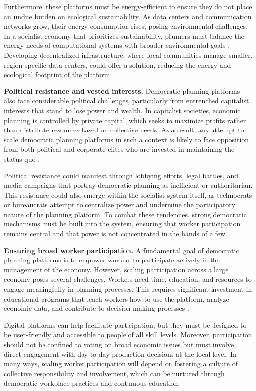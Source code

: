 \begin{refsection}
Furthermore, these platforms must be energy-efficient to ensure they do not place an undue burden on ecological sustainability. As data centers and communication networks grow, their energy consumption rises, posing environmental challenges. In a socialist economy that prioritizes sustainability, planners must balance the energy needs of computational systems with broader environmental goals \cite[pp.~76]{smil2018energy}. Developing decentralized infrastructure, where local communities manage smaller, region-specific data centers, could offer a solution, reducing the energy and ecological footprint of the platform.

\textbf{Political resistance and vested interests.} Democratic planning platforms also face considerable political challenges, particularly from entrenched capitalist interests that stand to lose power and wealth. In capitalist societies, economic planning is controlled by private capital, which seeks to maximize profits rather than distribute resources based on collective needs. As a result, any attempt to scale democratic planning platforms in such a context is likely to face opposition from both political and corporate elites who are invested in maintaining the status quo \cite[pp.~22]{wright2010envisioning}. 

Political resistance could manifest through lobbying efforts, legal battles, and media campaigns that portray democratic planning as inefficient or authoritarian. This resistance could also emerge within the socialist system itself, as technocrats or bureaucrats attempt to centralize power and undermine the participatory nature of the planning platform. To combat these tendencies, strong democratic mechanisms must be built into the system, ensuring that worker participation remains central and that power is not concentrated in the hands of a few.

\textbf{Ensuring broad worker participation.} A fundamental goal of democratic planning platforms is to empower workers to participate actively in the management of the economy. However, scaling participation across a large economy poses several challenges. Workers need time, education, and resources to engage meaningfully in planning processes. This requires significant investment in educational programs that teach workers how to use the platform, analyze economic data, and contribute to decision-making processes \cite[pp.~209]{devine2020democracy}.

Digital platforms can help facilitate participation, but they must be designed to be user-friendly and accessible to people of all skill levels. Moreover, participation should not be confined to voting on broad economic issues but must involve direct engagement with day-to-day production decisions at the local level. In many ways, scaling worker participation will depend on fostering a culture of collective responsibility and involvement, which can be nurtured through democratic workplace practices and continuous education.


\end{refsection}
